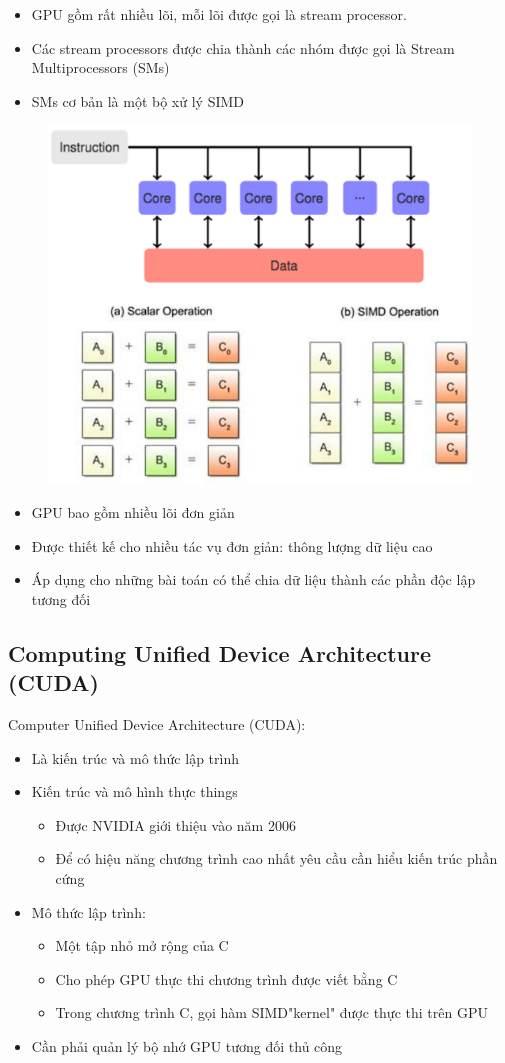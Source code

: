 \documentclass[14pt, a4paper]{article}
\numberwithin{equation}{section}
\numberwithin{figure}{section}
\numberwithin{dl}{section}
\numberwithin{md}{section}
\numberwithin{bd}{section}
\numberwithin{dn}{section}
\numberwithin{hq}{section}
\begin{document}
\begin{itemize}
    \item GPU gồm rất nhiều lõi, mỗi lõi được gọi là stream processor.
    \item Các stream processors được chia thành các nhóm được gọi là Stream Multiprocessors (SMs)
    \item SMs cơ bản là một bộ xử lý SIMD
\end{itemize}
\begin{figure}[H]
    \centering
    \includegraphics[width=0.6\linewidth]{figures/CUDA/SIMD.png}
\end{figure}

\begin{itemize}
    \item GPU bao gồm nhiều lõi đơn giản
    \item Được thiết kế cho nhiều tác vụ đơn giản: thông lượng dữ liệu cao
    \item Áp dụng cho những bài toán có thể chia dữ liệu thành các phần độc lập tương đối
\end{itemize}

\subsection{Computing Unified Device Architecture (CUDA)}

Computer Unified Device Architecture (CUDA):

\begin{itemize}
    \item Là kiến trúc và mô thức lập trình
    \item Kiến trúc và mô hình thực things
    \begin{itemize}
        \item Được NVIDIA giới thiệu vào năm 2006
        \item Để có hiệu năng chương trình cao nhất yêu cầu cần hiểu kiến trúc phần cứng
    \end{itemize}
    \item Mô thức lập trình:
    \begin{itemize}
        \item Một tập nhỏ mở rộng của C
        \item Cho phép GPU thực thi chương trình được viết bằng C
        \item Trong chương trình C, gọi hàm SIMD"kernel" được thực thi trên GPU
    \end{itemize}
    \item Cần phải quản lý bộ nhớ GPU tương đối thủ công
\end{itemize}
\end{document}
